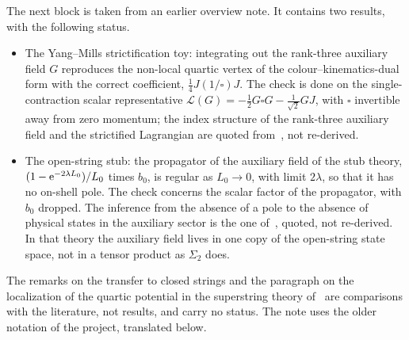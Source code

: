 The next block is taken from an earlier overview note.
It contains two results, with the following status.
\begin{itemize}
  \item The Yang--Mills strictification toy: integrating out the rank-three auxiliary field $G$ reproduces the non-local quartic vertex of the colour--kinematics-dual form with the correct coefficient, $\frac{1}{4} J (1 / \square) J$.
    The check is done on the single-contraction scalar representative $\mathscr L(G) = - \frac{1}{2} G \square G - \frac{1}{\sqrt 2} G J$, with $\square$ invertible away from zero momentum; the index structure of the rank-three auxiliary field and the strictified Lagrangian are quoted from~\cite{Borsten:2021:DoubleCopyHomotopy}, not re-derived.
  \item The open-string stub: the propagator of the auxiliary field of the stub theory, $(1 - \mathrm{e}^{- 2 \lambda L_0}) / L_0$ times $b_0$, is regular as $L_0 \to 0$, with limit $2 \lambda$, so that it has no on-shell pole.
    The check concerns the scalar factor of the propagator, with $b_0$ dropped.
    The inference from the absence of a pole to the absence of physical states in the auxiliary sector is the one of~\cite{ErbinFirat2023}, quoted, not re-derived.
    In that theory the auxiliary field lives in one copy of the open-string state space, not in a tensor product as $\Sigma_2$ does.
\end{itemize}
The remarks on the transfer to closed strings and the paragraph on the localization of the quartic potential in the superstring theory of~\cite{MaccaferriMerlano2019} are comparisons with the literature, not results, and carry no status.
The note uses the older notation of the project, translated below.

